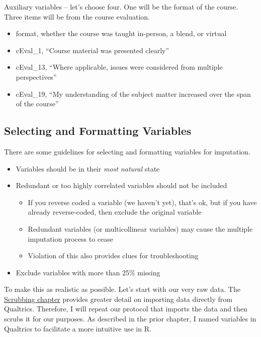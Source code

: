 \documentclass[
  english,
]{book}
\providecommand{\tightlist}{%
  \setlength{\itemsep}{0pt}\setlength{\parskip}{0pt}}
\begin{document}
Auxiliary variables -- let's choose four. One will be the format of the course. Three items will be from the course evaluation.

\begin{itemize}
\tightlist
\item
  format, whether the course was taught in-person, a blend, or virtual
\item
  cEval\_1, ``Course material was presented clearly''
\item
  cEval\_13, ``Where applicable, issues were considered from multiple perspectives''
\item
  cEval\_19, ``My understanding of the subject matter increased over the span of the course''
\end{itemize}

\hypertarget{selecting-and-formatting-variables}{%
\subsection{Selecting and Formatting Variables}\label{selecting-and-formatting-variables}}

There are some guidelines for selecting and formatting variables for imputation.

\begin{itemize}
\tightlist
\item
  Variables should be in their \emph{most natural} state
\item
  Redundant or too highly correlated variables should not be included

  \begin{itemize}
  \tightlist
  \item
    If you reverse coded a variable (we haven't yet), that's ok, but if you have already reverse-coded, then exclude the original variable
  \item
    Redundant variables (or multicollinear variables) may cause the multiple imputation process to cease
  \item
    Violation of this also provides clues for troubleshooting
  \end{itemize}
\item
  Exclude variables with more than 25\% missing
\end{itemize}

To make this as realistic as possible. Let's start with our very raw data. The \protect\hyperlink{scrub}{Scrubbing chapter} provides greater detail on importing data directly from Qualtrics. Therefore, I will repeat our protocol that imports the data and then scrubs it for our purposes. As described in the prior chapter, I named variables in Qualtrics to facilitate a more intuitive use in R.
\end{document}
